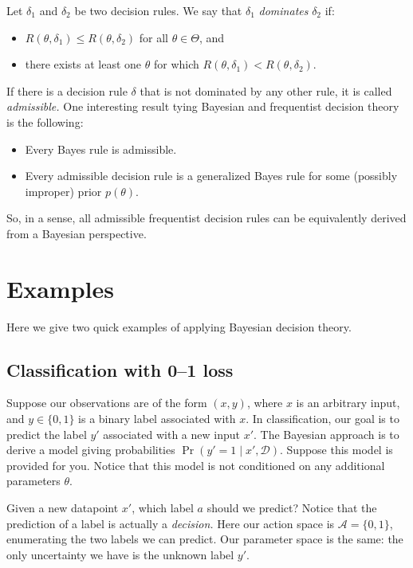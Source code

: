 \documentclass{article}
\newcommand{\given}{\mid}
\newcommand{\mc}[1]{\mathcal{#1}}
\newcommand{\data}{\mc{D}}
\begin{document}
Let $\delta_1$ and $\delta_2$ be two decision rules.  We say that
$\delta_1$ \emph{dominates} $\delta_2$ if:
\begin{itemize}
\item
  $R(\theta, \delta_1) \leq R(\theta, \delta_2)$ for all $\theta \in
  \Theta$, and
\item
  there exists at least one $\theta$ for which $R(\theta, \delta_1) <
  R(\theta, \delta_2)$.
\end{itemize}
If there is a decision rule $\delta$ that is not dominated by any
other rule, it is called \emph{admissible.} One interesting result
tying Bayesian and frequentist decision theory is the following:
\begin{itemize}
\item
  Every Bayes rule is admissible.
\item
  Every admissible decision rule is a generalized Bayes rule for some
  (possibly improper) prior $p(\theta)$.
\end{itemize}
So, in a sense, all admissible frequentist decision rules can be
equivalently derived from a Bayesian perspective.

\section*{Examples}

Here we give two quick examples of applying Bayesian decision theory.

\subsection*{Classification with 0--1 loss}

Suppose our observations are of the form $(x, y)$, where $x$ is an
arbitrary input, and $y \in \{0, 1\}$ is a binary label associated
with $x$.  In classification, our goal is to predict the label $y'$
associated with a new input $x'$. The Bayesian approach is to derive a
model giving probabilities $\Pr(y' = 1 \given x', \data)$.  Suppose
this model is provided for you.  Notice that this model is not
conditioned on any additional parameters $\theta$.

Given a new datapoint $x'$, which label $a$ should we predict?  Notice
that the prediction of a label is actually a \emph{decision.}  Here
our action space is $\mc{A} = \{0, 1\}$, enumerating the two labels we
can predict.  Our parameter space is the same: the only uncertainty we
have is the unknown label $y'$.
\end{document}
